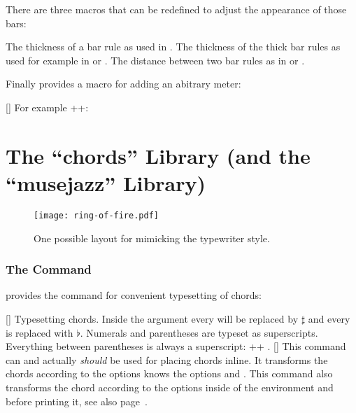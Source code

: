 \documentclass[load-preamble+]{cnltx-doc}
\def\library*#1{``#1''}%
\begin{document}
There are three macros that can be redefined to adjust the appearance of those
bars:
\begin{commands}
  \Default{.02em}
    The thickness of a bar rule as used in .
  \Default{.15em}
    The thickness of the thick bar rules as used for example in
     or .
  \Default{.1em}
    The distance between two bar rules as in  or .
\end{commands}

Finally \musicsymbols{} provides a macro for adding an abitrary meter:
\begin{commands}
  []
    For example \verbcode++: 
\end{commands}

\clearpage
\part{The \library*{chords} Library (and the \library*{musejazz}
  Library)}\label{part:chords-library}

\begin{figure}
  \centering
  \texttt{[image: ring-of-fire.pdf]}
  \caption{One possible layout for \leadsheets{} mimicking the typewriter
    style.}
  \label{fig:leadsheet}
\end{figure}

\section{The  Command}

\chords{} provides the command  for convenient
typesetting of chords:

\begin{example}
   
   
\end{example}

\begin{commands}
  []
    Typesetting chords.  Inside the argument every \code{\#} will be replaced
    by $\sharp$ and every  is replaced with $\flat$.  Numerals and
    parentheses are typeset as superscripts.  Everything between parentheses
    is always a superscript: \verbcode++
    .
  []
    This command can and actually \emph{should} be used for placing chords
    inline. It transforms the chords according to the options knows the
    options  and .  This
    command also transforms the chord according to the options inside of the
     environment  and  before
    printing it, see also page~\pageref{cs:writechord}.
\end{commands}
\end{document}
